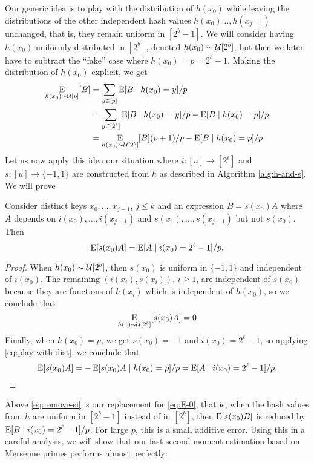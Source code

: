 Our generic idea is to play with the distribution of $h(x_0)$ while
leaving the distributions of the other independent hash values
$h(x_0)\ldots,h(x_{j - 1})$ unchanged, that is, they remain uniform in
$[2^b-1]$. We will consider having $h(x_0)$ uniformly distributed in
$[2^b]$, denoted $h(x_0) \sim \mathcal{U}[2^b]$, but then we later have to
subtract the ``fake'' case where $h(x_0)=p=2^b-1$.  Making the
distribution of $h(x_0)$ explicit, we get
\begin{equation}\begin{split}
		\operatorname*{E}_{h(x_0) \sim \mathcal{U}[p]}[B]&=\sum_{y\in[p]}\operatorname*{E}[B \mid h(x_0)=y]/p
		\\&=\sum_{y\in[2^b]}\operatorname*{E}[B \mid h(x_0)=y]/p - \operatorname*{E}[B \mid h(x_0)=p]/p
		\\ &=\operatorname*{E}_{h(x_0) \sim \mathcal{U}[2^b]}[B](p+1)/p - \operatorname*{E}[B \mid h(x_0)=p]/p.\label{eq:play-with-dist}
	\end{split}\end{equation}
Let us now apply this idea our situation where $i:[u]\to[2^\ell]$ and
$s:[u]\to\{-1,1\}$ are constructed from $h$ as described in Algorithm
\ref{alg:h-and-s}. We will prove
\begin{lemma}\label{lem:remove-si}  Consider distinct keys $x_0,\ldots,x_{j - 1}$, $j\leq k$ and an expression $B=s(x_0)A$ where $A$
	depends on $i(x_0),\ldots,i(x_{j - 1})$ and $s(x_1),\ldots,s(x_{j - 1})$ but not
	$s(x_0)$. Then
	\begin{equation}\label{eq:remove-si}
		\operatorname*{E}[s(x_0)A]=\operatorname*{E}[A\mid i(x_0)=2^\ell-1]/p.
	\end{equation}
\end{lemma}
\begin{proof}
	When $h(x_0) \sim \mathcal{U}[2^b]$, then $s(x_0)$ is uniform
	in $\{-1,1\}$ and independent of $i(x_0)$. The remaining
	$(i(x_i),s(x_i))$, $i\ge 1$, are independent of $s(x_0)$ because they
	are functions of $h(x_i)$ which is independent of $h(x_0)$, so
	we conclude that
	\[\operatorname*{E}_{h(x) \sim \mathcal{U}[2^b]}[s(x_0)A]=0\]
	Finally, when $h(x_0)=p$, we get $s(x_0)=-1$ and $i(x_0)=2^\ell-1$,
	so applying \eqref{eq:play-with-dist}, we conclude
	that
	\[\operatorname*{E}[s(x_0)A] = -\operatorname*{E}[s(x_0) A \mid h(x_0) = p]/p = \operatorname*{E}[A \mid i(x_0)=2^\ell-1]/p.\]
\end{proof}
Above \eqref{eq:remove-si} is our replacement for \eqref{eq:E-0}, that is,
when the hash values from $h$ are uniform in $[2^b-1]$ instead of
in $[2^b]$, then $\operatorname*{E}[s(x_0)B]$ is reduced by $\operatorname*{E}[B \mid i(x_0)=2^\ell-1]/p$.
For large $p$, this is a small additive error. Using this in a careful
analysis, we will show that our fast second moment estimation
based on Mersenne primes performs almost perfectly:

